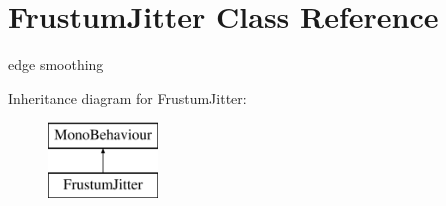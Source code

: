 \hypertarget{class_frustum_jitter}{}\section{Frustum\+Jitter Class Reference}
\label{class_frustum_jitter}


edge smoothing  


Inheritance diagram for Frustum\+Jitter\+:\begin{figure}[H]
\begin{center}
\leavevmode
\includegraphics[height=2.000000cm]{class_frustum_jitter}
\end{center}
\end{figure}
